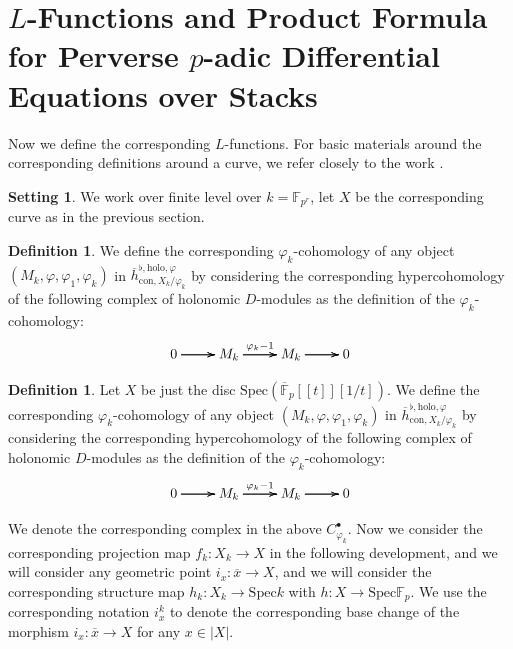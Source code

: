 \documentclass[11pt]{book}
\theoremstyle{definition}
\newtheorem{definition}[theorem]{Definition}
\numberwithin{equation}{section}
\newtheorem{setting}[theorem]{Setting}
\begin{document}
\newpage





\section{$L$-Functions and Product Formula for Perverse $p$-adic Differential Equations over Stacks}

\indent Now we define the corresponding $L$-functions. For basic materials around the corresponding definitions around a curve, we refer closely to the work \cite{AM}.  

\begin{setting}
We work over finite level over $k=\mathbb{F}_{p^r}$, let $X$ be the corresponding curve as in the previous section.	
\end{setting}




\begin{definition} 
We define the corresponding $\varphi_k$-cohomology of any object $(M_k,\varphi,\varphi_1,\varphi_k)$ in $\overline{h}^{\flat,\mathrm{holo},\varphi}_{\mathrm{con},X_k/\varphi_k}$ by considering the corresponding hypercohomology of the following complex of holonomic $D$-modules as the definition of the $\varphi_k$-cohomology:
\[
\xymatrix@R+0pc@C+0pc{
0 \ar[r] \ar[r] \ar[r] &M_k  \ar[r]^{\varphi_k-1} \ar[r] \ar[r] &M_k \ar[r] \ar[r] \ar[r] &0
}
\]

\end{definition}





\begin{definition} 
Let $X$ be just the disc $\mathrm{Spec}(\overline{\mathbb{F}}_p[[t]][1/t])$. We define the corresponding $\varphi_k$-cohomology of any object $(M_k,\varphi,\varphi_1,\varphi_k)$ in $\overline{h}^{\flat,\mathrm{holo},\varphi}_{\mathrm{con},X_k/\varphi_k}$ by considering the corresponding hypercohomology of the following complex of holonomic $D$-modules as the definition of the $\varphi_k$-cohomology:
\[
\xymatrix@R+0pc@C+0pc{
0 \ar[r] \ar[r] \ar[r] &M_k  \ar[r]^{\varphi_k-1} \ar[r] \ar[r] &M_k \ar[r] \ar[r] \ar[r] &0
}
\]

\end{definition}




\indent We denote the corresponding complex in the above $C_{\varphi_k}^\bullet$. Now we consider the corresponding projection map $f_k:X_k\rightarrow X$ in the following development, and we will consider any geometric point $i_x:\overline{x}\rightarrow X$, and we will consider the corresponding structure map $h_k:X_k\rightarrow \mathrm{Spec}k$ with $h:X\rightarrow \mathrm{Spec}\mathbb{F}_p$.  We use the corresponding notation $i^k_x$ to denote the corresponding base change of the morphism $i_x:\overline{x}\rightarrow X$ for any $x\in |X|$.
\end{document}

